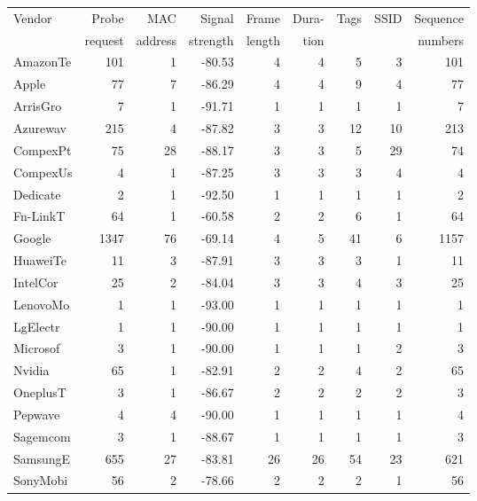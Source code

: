 \begin{table}
\footnotesize
\begin{center}
  \begin{tabular}{lrrrrrrrr}
  \toprule
  Vendor & Probe & MAC & Signal & Frame & Dura-& Tags & SSID & Sequence \\ 
  & request & address & strength & length &  tion &  &  & numbers \\ 
  \midrule
  AmazonTe &  101 &   1 & -80.53 &   4 &   4 &   5 &   3 & 101 \\ 
  Apple    &   77 &   7 & -86.29 &   4 &   4 &   9 &   4 &  77 \\ 
  ArrisGro &    7 &   1 & -91.71 &   1 &   1 &   1 &   1 &   7 \\ 
  Azurewav &  215 &   4 & -87.82 &   3 &   3 &  12 &  10 & 213 \\ 
  CompexPt &   75 &  28 & -88.17 &   3 &   3 &   5 &  29 &  74 \\ 
  CompexUs &    4 &   1 & -87.25 &   3 &   3 &   3 &   4 &   4 \\ 
  Dedicate &    2 &   1 & -92.50 &   1 &   1 &   1 &   1 &   2 \\ 
  Fn-LinkT &   64 &   1 & -60.58 &   2 &   2 &   6 &   1 &  64 \\ 
  Google   & 1347 &  76 & -69.14 &   4 &   5 &  41 &   6 & 1157 \\ 
  HuaweiTe &   11 &   3 & -87.91 &   3 &   3 &   3 &   1 &  11 \\ 
  IntelCor &   25 &   2 & -84.04 &   3 &   3 &   4 &   3 &  25 \\ 
  LenovoMo &    1 &   1 & -93.00 &   1 &   1 &   1 &   1 &   1 \\ 
  LgElectr &    1 &   1 & -90.00 &   1 &   1 &   1 &   1 &   1 \\ 
  Microsof &    3 &   1 & -90.00 &   1 &   1 &   1 &   2 &   3 \\ 
  Nvidia   &   65 &   1 & -82.91 &   2 &   2 &   4 &   2 &  65 \\ 
  OneplusT &    3 &   1 & -86.67 &   2 &   2 &   2 &   2 &   3 \\ 
  Pepwave  &    4 &   4 & -90.00 &   1 &   1 &   1 &   1 &   4 \\ 
  Sagemcom &    3 &   1 & -88.67 &   1 &   1 &   1 &   1 &   3 \\ 
  SamsungE &  655 &  27 & -83.81 &  26 &  26 &  54 &  23 & 621 \\ 
  SonyMobi &   56 &   2 & -78.66 &   2 &   2 &   2 &   1 &  56 \\ 

\end{tabular}
\end{center}
\end{table}
